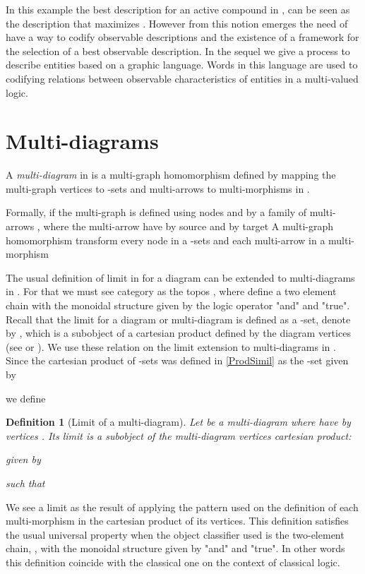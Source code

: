 \documentclass[oribibl]{llncs}
\newtheorem{defn}{Definition}
\begin{document}
In this example the best description  for an active compound in , can be seen as the description that maximizes . However from this notion emerges the need of have a way to codify observable descriptions and the existence of a framework for the selection of a best observable description. In the sequel we give a process to describe entities based on a graphic language. Words in this language are used to codifying relations between observable characteristics of entities in a multi-valued logic.


\section{Multi-diagrams}\label{multidiagrams}

A \emph{multi-diagram} in  is a multi-graph homomorphism  defined by mapping the multi-graph vertices to -sets and multi-arrows to multi-morphisms in .

Formally, if the multi-graph  is defined using nodes  and by a family of multi-arrows , where the multi-arrow  have by source  and by target  A multi-graph homomorphism  transform every node  in a -sets  and each multi-arrow   in a multi-morphism 

The usual definition of limit in  for a diagram can be extended to multi-diagrams in . For that we must see category  as the topos , where  define a two element chain with the monoidal structure given by the logic operator "and" and "true". Recall that the limit for a diagram or multi-diagram  is defined as a -set, denote by , which is a subobject of a cartesian product defined by the diagram vertices (see \cite{maclane71} or \cite{Borceux94}). We use these relation on the limit extension to multi-diagrams in . Since the cartesian product of -sets  was defined in \ref{ProdSimil} as the -set  given by

we define
\begin{defn}[Limit of a multi-diagram]\label{lim}
Let  be a multi-diagram where  have by vertices . Its limit  is a subobject of the multi-diagram vertices cartesian product:

given by
 
such that


\end{defn}
We see a limit as the result of applying the pattern used on the definition of each multi-morphism in the cartesian product of its vertices. This definition satisfies the usual universal property when the object classifier used  is the two-element chain, , with the monoidal structure given by "and" and "true". In other words this definition coincide with the classical one on the context of classical logic.
\end{document}
